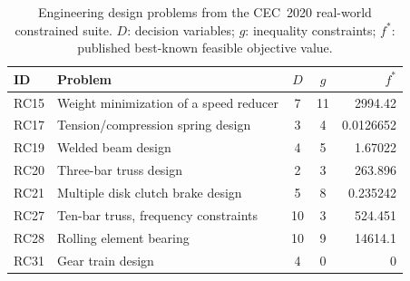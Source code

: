\begin{table}[htbp]
\centering\small
\caption{Engineering design problems from the CEC~2020 real-world constrained suite. $D$: decision variables; $g$: inequality constraints; $f^{*}$: published best-known feasible objective value.}
\label{tab:eng_setup}
\begin{tabular}{llccr}
\toprule
ID & Problem & $D$ & $g$ & $f^{*}$ \\
\midrule
RC15 & Weight minimization of a speed reducer & 7 & 11 & 2994.42 \\
RC17 & Tension/compression spring design & 3 & 4 & 0.0126652 \\
RC19 & Welded beam design & 4 & 5 & 1.67022 \\
RC20 & Three-bar truss design & 2 & 3 & 263.896 \\
RC21 & Multiple disk clutch brake design & 5 & 8 & 0.235242 \\
RC27 & Ten-bar truss, frequency constraints & 10 & 3 & 524.451 \\
RC28 & Rolling element bearing & 10 & 9 & 14614.1 \\
RC31 & Gear train design & 4 & 0 & 0 \\
\bottomrule
\end{tabular}
\end{table}

